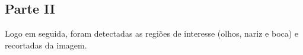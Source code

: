 \documentclass[journal]{IEEEtran}
\begin{document}
\begin{figure}[h]
\centering
{}
\end{figure}

\subsection*{Parte II}
Logo em seguida, foram detectadas as regiões de interesse (olhos, nariz e boca) e recortadas da imagem.
\end{document}
